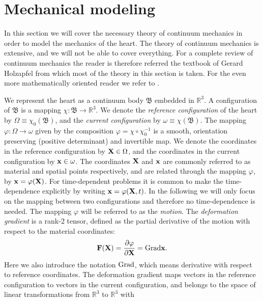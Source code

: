 \section{Mechanical modeling}
\label{sec:intro_mechanical}

In this section we will cover the necessary theory of continuum
mechanics in order to model the mechanics of the heart. The theory of
continuum mechanics is extensive, and we will not be able to cover
everything. For a complete review of continuum mechanics the reader is
therefore referred the textbook of Gerard Holzapfel
\cite{holzapfel2000nonlinear} from which most of the theory in this
section is taken. For the even more mathematically oriented reader we
refer to \cite{marsden1994mathematical}.

We represent the heart as a continuum body $\mathfrak{B}$ embedded in
$\mathbb{R}^3$. A configuration of $\mathfrak{B}$ is a mapping $\chi:
\mathfrak{B} \rightarrow \mathbb{R}^3$. 
We denote the \emph{reference configuration} of the heart by $\Omega
\equiv \chi_0(\mathfrak{B})$, and the \emph{current configuration} by $\omega
\equiv \chi(\mathfrak{B})$. The mapping $\varphi :  \Omega
\rightarrow \omega$ given by the composition $\varphi = \chi
\circ \chi_0^{-1}$ is a smooth, orientation preserving (positive
determinant) and invertible map. We denote the coordinates in the
reference configuration by $\mathbf{X} \in \Omega$, and the coordinates in the current
configuration by $\mathbf{x} \in \omega$. The coordinates $\mathbf{X}$ and $\mathbf{x}$ are
commonly referred to as material and spatial points respectively, and
are related through the mapping $\varphi$, by $\mathbf{x} = \varphi(\mathbf{X})$.
For time-dependent problems it is common to make  the time-dependence
explicitly by writing $\mathbf{x} = \varphi(\mathbf{X}, t)$. In the following
we will only focus on the mapping between two configurations and
therefore no time-dependence is needed. The mapping $\varphi$ will be
referred to as the \emph{motion}. The \emph{deformation gradient} is a
rank-2 tensor, defined as the partial derivative of the motion with
respect to the material coordinates:
\begin{align}
  \mathbf{F}(\mathbf{X}) = \frac{\partial \varphi}{\partial \mathbf{X}} = \mathrm{Grad} \mathbf{x}.
  \label{eq:deformation_gradient}
\end{align}
Here we also introduce the notation $\mathrm{Grad}$, which means derivative
with respect to reference coordinates.
The deformation gradient maps vectors in the reference configuration to
vectors in the current configuration, and belongs to the space of
linear transformations from $\mathbb{R}^3$ to $\mathbb{R}^3$ with
